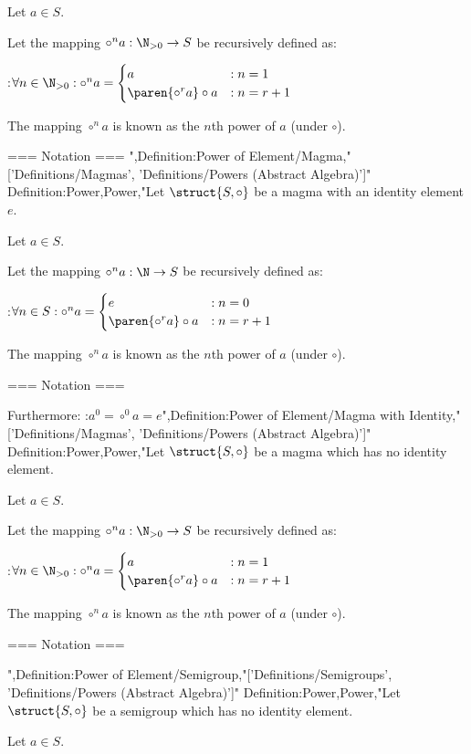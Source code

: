 Let $a \in S$.


Let the mapping $\circ^n a: \N_{>0} \to S$ be recursively defined as:

:$\forall n \in \N_{>0}: \circ^n a = \begin{cases}
a & : n = 1 \\
\paren {\circ^r a} \circ a & : n = r + 1
\end{cases}$


The mapping $\circ^n a$ is known as the $n$th power of $a$ (under $\circ$).


=== Notation ===
",Definition:Power of Element/Magma,"['Definitions/Magmas', 'Definitions/Powers (Abstract Algebra)']"
Definition:Power,Power,"Let $\struct {S, \circ}$ be a magma with an identity element $e$.

Let $a \in S$.


Let the mapping $\circ^n a: \N \to S$ be recursively defined as:

:$\forall n \in S: \circ^n a = \begin{cases}
e & : n = 0 \\
\paren {\circ^r a} \circ a & : n = r + 1
\end{cases}$


The mapping $\circ^n a$ is known as the $n$th power of $a$ (under $\circ$).


=== Notation ===


Furthermore:
:$a^0 = \circ^0 a = e$",Definition:Power of Element/Magma with Identity,"['Definitions/Magmas', 'Definitions/Powers (Abstract Algebra)']"
Definition:Power,Power,"Let $\struct {S, \circ}$ be a magma which has no identity element.

Let $a \in S$.


Let the mapping $\circ^n a: \N_{>0} \to S$ be recursively defined as:

:$\forall n \in \N_{>0}: \circ^n a = \begin{cases}
a & : n = 1 \\
\paren {\circ^r a} \circ a & : n = r + 1
\end{cases}$


The mapping $\circ^n a$ is known as the $n$th power of $a$ (under $\circ$).


=== Notation ===

",Definition:Power of Element/Semigroup,"['Definitions/Semigroups', 'Definitions/Powers (Abstract Algebra)']"
Definition:Power,Power,"Let $\struct {S, \circ}$ be a semigroup which has no identity element.

Let $a \in S$.


